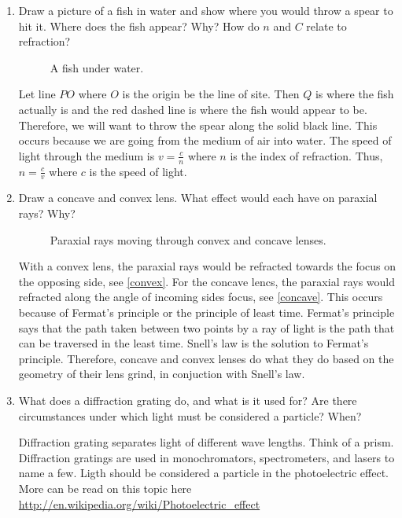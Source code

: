 \begin{enumerate}
  \begin{gather*}
    \frac{dT}{dx} = \frac{\sin(\theta_1)}{v_1} - \frac{\sin(\theta_2)}{v_2}
    = 0\\
    \Rightarrow\frac{\sin(\theta_1)}{v_1} = \frac{\sin(\theta_2)}{v_2}\\
    \Rightarrow\frac{\sin(\theta_1)}{\sin(\theta_2)} = \frac{n_2}{n_1}
    \eqnumtag\label{snell}
  \end{gather*}
  where \cref{snell} is Snell's law.
\item
  Draw a picture of a fish in water and show where you would throw a spear to
  hit it.
  Where does the fish appear?
  Why?
  How do \(n\) and \(C\) relate to refraction?
  \begin{figure}[H]
    \centering
    
    \caption{A fish under water.}
  \end{figure}
  Let line \(PO\) where \(O\) is the origin be the line of site.
  Then \(Q\) is where the fish actually is and the red dashed line is where the
  fish would appear to be.
  Therefore, we will want to throw the spear along the solid black line.
  This occurs because we are going from the medium of air into water.
  The speed of light through the medium is \(v = \frac{c}{n}\) where \(n\) is
  the index of refraction.
  Thus, \(n = \frac{c}{v}\) where \(c\) is the speed of light.
\item
  Draw a concave and convex lens.
  What effect would each have on paraxial rays?
  Why?
  \begin{figure}[H]
    \centering
    \qquad
    \caption{Paraxial rays moving through convex and concave lenses.}
  \end{figure}
  With a convex lens, the paraxial rays would be refracted towards the focus
  on the opposing side, see \cref{convex}.
  For the concave lencs, the paraxial rays would refracted along the angle of
  incoming sides focus, see \cref{concave}.
  This occurs because of Fermat's principle or the principle of least time.
  Fermat's principle says that the path taken between two points by a ray of
  light is the path that can be traversed in the least time.
  Snell's law is the solution to Fermat's principle.
  Therefore, concave and convex lenses do what they do based on the geometry
  of their lens grind, in conjuction with Snell's law.
\item
  What does a diffraction grating do, and what is it used for?
  Are there circumstances under which light must be considered a particle?
  When?
  \par\smallskip
  Diffraction grating separates light of different wave lengths.
  Think of a prism.
  Diffraction gratings are used in monochromators, spectrometers, and lasers to
  name a few.
  Ligth should be considered a particle in the photoelectric effect.
  More can be read on this topic here
  \url{http://en.wikipedia.org/wiki/Photoelectric_effect}
\end{enumerate}

